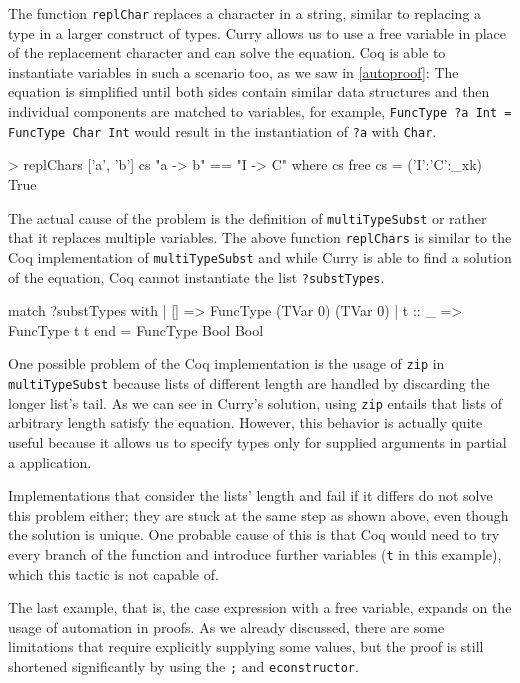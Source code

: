 \documentclass[paper = a4, fleqn, abstract=on, twoside]{scrreprt}
\begin{document}
The function \texttt{replChar} replaces a character in a string, similar to replacing a type in a larger construct of types. Curry allows us to use a free variable in place of the replacement character and can solve the equation. Coq is able to instantiate variables in such a scenario too, as we saw in \autoref{autoproof}: The equation is simplified until both sides contain similar data structures and then individual components are matched to variables, for example, \texttt{FuncType ?a Int = FuncType Char Int} would result in the instantiation of \texttt{?a} with \texttt{Char}.
\begin{coqcode}
> replChars ['a', 'b'] cs "a -> b" == "I -> C" where cs free
{cs = ('I':'C':_xk)} True
\end{coqcode}
The actual cause of the problem is the definition of \texttt{multiTypeSubst} or rather that it replaces multiple variables. The above function \texttt{replChars} is similar to the Coq implementation of \texttt{multiTypeSubst} and while Curry is able to find a solution of the equation, Coq cannot instantiate the list \texttt{?substTypes}.
\begin{coqcode}
match ?substTypes with
| [] => FuncType (TVar 0) (TVar 0)
| t :: _ => FuncType t t
end = FuncType Bool Bool
\end{coqcode}
One possible problem of the Coq implementation is the usage of \texttt{zip} in \texttt{multiTypeSubst} because lists of different length are handled by discarding the longer list's tail. As we can see in Curry's solution, using \texttt{zip} entails that lists of arbitrary length satisfy the equation. However, this behavior is actually quite useful because it allows us to specify types only for supplied arguments in partial a application.
\par \noindent
Implementations that consider the lists' length and fail if it differs do not solve this problem either; they are stuck at the same step  as shown above, even though the solution is unique. One probable cause of this is that Coq would need to try every branch of the function and introduce further variables (\texttt{t} in this example), which this tactic is not capable of.\\
\par \noindent
The last example, that is, the case expression with a free variable, expands on the usage of automation in proofs. As we already discussed, there are some limitations that require explicitly supplying some values, but the proof is still shortened significantly by using the \texttt{;} and \texttt{econstructor}.
\end{document}
